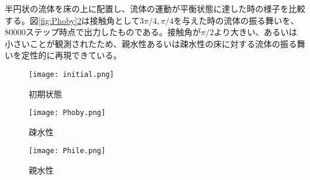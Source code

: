 \documentclass[]{jsarticle}
\begin{document}
半円状の流体を床の上に配置し、流体の運動が平衡状態に達した時の様子を比較する。図\ref{fig:Phoby}\ref{fig:Phile}は接触角として$3\pi/4, \pi/4$を与えた時の流体の振る舞いを、80000ステップ時点で出力したものである。接触角が$\pi/2$より大きい、あるいは小さいことが観測されたため、親水性あるいは疎水性の床に対する流体の振る舞いを定性的に再現できている。
\begin{figure}[h]
  \centering
  \texttt{[image: initial.png]}
  \caption{初期状態}
  \label{fig:initial}
\end{figure}
\begin{figure}[h]
  \centering
  \begin{minipage}{0.4\columnwidth}
    \centering
    \texttt{[image: Phoby.png]}
    \caption{疎水性}
    \label{fig:Phoby}
  \end{minipage}
  \begin{minipage}{0.4\columnwidth}
    \centering
    \texttt{[image: Phile.png]}
    \caption{親水性}
    \label{fig:Phile}
  \end{minipage}
\end{figure}
\end{document}
